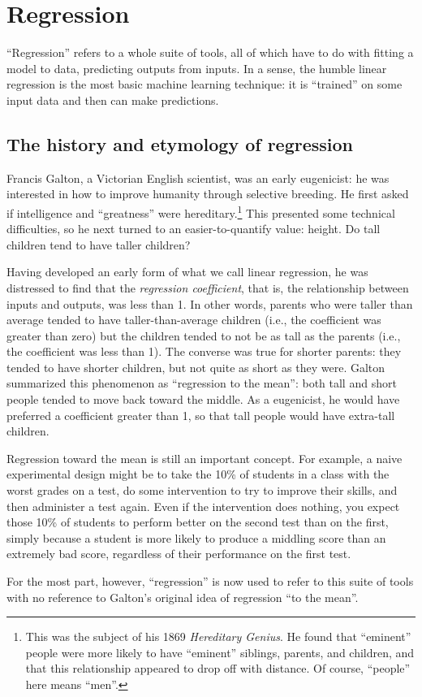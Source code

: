 
\chapter{Regression}

``Regression'' refers to a whole suite of tools, all of which have to do with
fitting a model to data, predicting outputs from inputs. In a sense, the
humble linear regression is the most basic machine learning technique: it is
``trained'' on some input data and then can make predictions.

\section{The history and etymology of regression}

Francis Galton, a Victorian English scientist, was an early eugenicist: he was
interested in how to improve humanity through selective breeding. He first
asked if intelligence and ``greatness'' were hereditary.\footnote{This was the
subject of his 1869 \textit{Hereditary Genius}. He found that ``eminent''
people were more likely to have ``eminent'' siblings, parents, and children,
and that this relationship appeared to drop off with distance. Of course,
``people'' here means ``men''.} This presented some technical difficulties, so
he next turned to an easier-to-quantify value: height. Do tall children tend
to have taller children?

Having developed an early form of what we call linear regression, he was
distressed to find that the \emph{regression coefficient}, that is, the
relationship between inputs and outputs, was less than 1. In other words,
parents who were taller than average tended to have taller-than-average
children (i.e., the coefficient was greater than zero) but the children tended
to not be as tall as the parents (i.e., the coefficient was less than 1). The
converse was true for shorter parents: they tended to have shorter children,
but not quite as short as they were. Galton summarized this phenomenon as
``regression to the mean'': both tall and short people tended to move back
toward the middle. As a eugenicist, he would have preferred a coefficient
greater than 1, so that tall people would have extra-tall children.

Regression toward the mean is still an important concept. For example, a naive
experimental design might be to take the 10\% of students in a class with the
worst grades on a test, do some intervention to try to improve their skills,
and then administer a test again. Even if the intervention does nothing, you
expect those 10\% of students to perform better on the second test than on the
first, simply because a student is more likely to produce a middling score
than an extremely bad score, regardless of their performance on the first
test.

For the most part, however, ``regression'' is now used to refer to this suite
of tools with no reference to Galton's original idea of regression ``to the
mean''.
